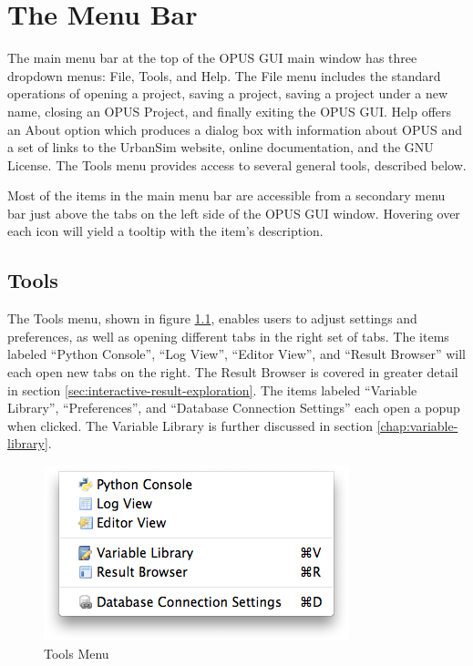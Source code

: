 \chapter{The Menu Bar}

The main menu bar at the top of the OPUS GUI main window has three dropdown
menus: File, Tools, and Help.  The File menu includes the standard
operations of opening a project, saving a project, saving a project under a
new name, closing an OPUS Project, and finally exiting the OPUS GUI\@.  Help
offers an About option which produces a dialog box with information about
OPUS and a set of links to the UrbanSim website, online documentation, and
the GNU License.  The Tools menu provides access to several general tools,
described below.

Most of the items in the main menu bar are accessible from a secondary menu
bar just above the tabs on the left side of the OPUS GUI window.  Hovering
over each icon will yield a tooltip with the item's description.

\section{Tools}

The Tools menu, shown in figure \ref{fig:menu-bar-tools}, enables users to
adjust settings and preferences, as well as opening different tabs in the
right set of tabs.  The items labeled ``Python Console'', ``Log View'', ``Editor
View'', and ``Result Browser'' will each open new tabs on the right.  The
Result Browser is covered in greater detail in section
\ref{sec:interactive-result-exploration}.  The items labeled ``Variable
Library'', ``Preferences'', and ``Database Connection Settings'' each open a
popup when clicked.  The Variable Library is further discussed in section
\ref{chap:variable-library}.

\begin{figure}[htp]
\begin{center}
\includegraphics[scale=0.4]{part-gui/images/menu-bar-tools.png}
\end{center}
\caption{Tools Menu}
\label{fig:menu-bar-tools}
\end{figure}


